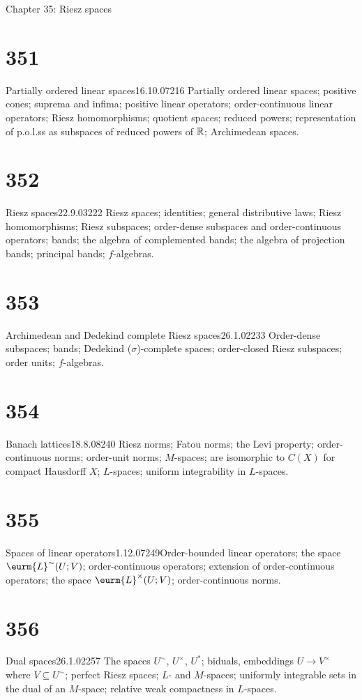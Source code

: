      
 Chapter 35:  Riesz spaces
     
     
\section{351}{Partially ordered linear spaces}{16.10.07}{216}{}
{Partially ordered linear spaces;  positive cones;  suprema and
infima;  positive linear operators;  order-continuous linear operators;
Riesz homomorphisms;  quotient spaces;  reduced powers;
representation of p.o.l.ss as subspaces of reduced powers of $\Bbb{R}$;
Archimedean spaces.}
     
\section{352}{Riesz spaces}{22.9.03}{222}{}
{Riesz spaces;  identities;  general distributive laws;  Riesz
homomorphisms;  Riesz subspaces;  order-dense subspaces and
order-continuous operators;   bands;  the algebra of complemented bands;
the algebra of projection bands;  principal bands;  $f$-algebras.}
     
\section{353}{Archimedean and Dedekind complete Riesz
spaces}{26.1.02}{233}{}
{Order-dense subspaces;  bands;  Dedekind ($\sigma$)-complete
spaces;  order-closed Riesz subspaces;  order units;  $f$-algebras.}
     
\section{354}{Banach lattices}{18.8.08}{240}{}
{Riesz norms;  Fatou norms;  the Levi property;  order-continuous
norms;  order-unit norms;  $M$-spaces;  are isomorphic to $C(X)$ for
compact Hausdorff $X$;  $L$-spaces;  uniform integrability in
$L$-spaces.}
     
\section{355}{Spaces of linear operators}{1.12.07}{249}{}{Order-bounded
linear
operators;  the space $\eurm{L}^{\sim}(U;V)$;
order-continuous operators;  extension of order-continuous operators;
the space $\eurm{L}^{\times}(U;V)$;  order-continuous norms.}
     
\section{356}{Dual spaces}{26.1.02}{257}{}
{The spaces $U^{\sim}$, $U^{\times}$, $U^*$;  biduals, embeddings
$U{\to}V^{\times}$ where $V{\subseteq}U^{\sim}$;  perfect Riesz spaces;
$L$- and $M$-spaces;  uniformly integrable sets in the dual of an
$M$-space;  relative weak compactness in $L$-spaces.}
     
